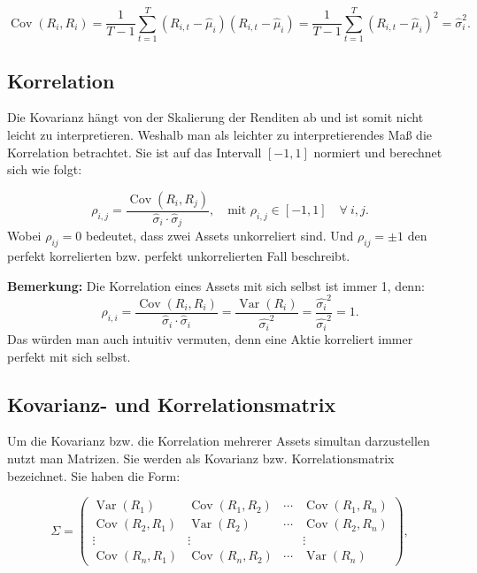 \documentclass[parskip=half]{scrartcl}
\begin{document}
	\begin{equation}
		\operatorname{Cov}(R_i,R_i) = \frac{1}{T-1} \sum_{t=1}^{T} (R_{i,t} - \hat{\mu}_i)(R_{i,t} - \hat{\mu}_i) = \frac{1}{T-1} \sum_{t=1}^{T} (R_{i,t} - \hat{\mu}_i)^2 = \hat{\sigma}_i^2.
	\end{equation}
	
	\subsection{Korrelation}
	Die Kovarianz hängt von der Skalierung der Renditen ab und ist somit nicht leicht zu interpretieren. Weshalb man als leichter zu interpretierendes Maß die Korrelation betrachtet. Sie ist auf das Intervall $[-1,1]$ normiert und berechnet sich wie folgt:
	
	\begin{equation}
		\rho_{i,j} = \frac{\operatorname{Cov}(R_i,R_j)}{\hat{\sigma}_i \cdot \hat{\sigma}_j} , \quad \text{mit } \rho_{i,j} \in [-1,1] \quad \forall \ i,j. \label{eq:korrelation}
	\end{equation}
	Wobei $\rho_{ij} = 0$ bedeutet, dass zwei Assets unkorreliert sind. Und $\rho_{ij} = \pm 1$ den perfekt korrelierten bzw. perfekt unkorrelierten Fall beschreibt.
	
	\textbf{Bemerkung:} Die Korrelation eines Assets mit sich selbst ist immer 1, denn:
	\begin{equation}
		\rho_{i,i} = \frac{\operatorname{Cov}(R_i,R_i)}{\hat{\sigma}_i \cdot \hat{\sigma}_i} = \frac{\operatorname{Var}(R_i)}{\hat{\sigma_i}^2} = \frac{\hat{\sigma_i}^2}{\hat{\sigma_i}^2} = 1.
	\end{equation}
	Das würden man auch intuitiv vermuten, denn eine Aktie korreliert immer perfekt mit sich selbst.
	
	\subsection{Kovarianz- und Korrelationsmatrix}
	Um die Kovarianz bzw. die Korrelation mehrerer Assets simultan darzustellen nutzt man Matrizen. Sie werden als Kovarianz bzw. Korrelationsmatrix bezeichnet.
	Sie haben die Form:
	
	\begin{equation}
		\Sigma = \begin{pmatrix}
			\operatorname{Var}(R_1) & \operatorname{Cov}(R_1,R_2) & \cdots & \operatorname{Cov}(R_1,R_n) 	\\
			\operatorname{Cov}(R_2,R_1) & \operatorname{Var}(R_2) & \cdots & \operatorname{Cov}(R_2,R_n) 	\\
			\vdots & \vdots &  & \vdots										 								\\
			\operatorname{Cov}(R_n,R_1) & \operatorname{Cov}(R_n,R_2) & \cdots & \operatorname{Var}(R_n)
		\end{pmatrix},										\label{eq:kovarianzmatrix}
	\end{equation}
	
\end{document}
